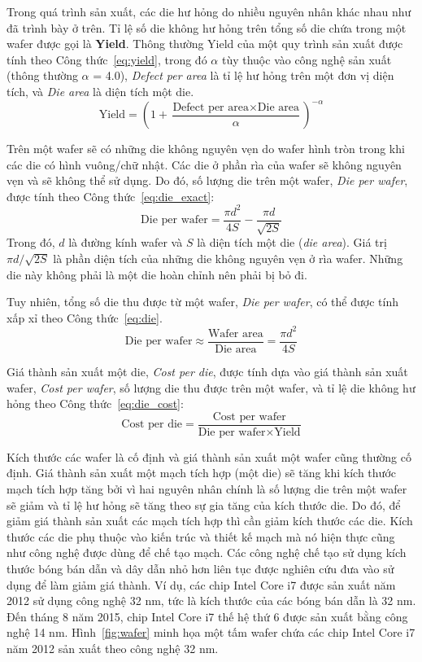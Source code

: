 Trong quá trình sản xuất, các die hư hỏng do nhiều nguyên nhân khác nhau như đã trình bày ở trên. Tỉ lệ số die không hư hỏng trên tổng số die chứa trong một wafer được gọi là \textbf{Yield}. Thông thường Yield của một quy trình sản xuất được tính theo Công thức~\ref{eq:yield}, trong đó $\alpha$ tùy thuộc vào công nghệ sản xuất (thông thường $\alpha$ = 4.0), \emph{Defect per area} là tỉ lệ hư hỏng trên một đơn vị diện tích, và \emph{Die area} là diện tích một die.
\begin{equation}
\label{eq:yield}
\text{Yield} = (1 + \frac{\text{Defect per area} \times \text{Die area}}{\alpha})^{-\alpha}
\end{equation}

Trên một wafer sẽ có những die không nguyên vẹn do wafer hình tròn trong khi các die có hình vuông/chữ nhật. Các die ở phần rìa của wafer sẽ không nguyên vẹn và sẽ không thể sử dụng. Do đó, số lượng die trên một wafer, \emph{Die per wafer}, được tính theo Công thức~\ref{eq:die_exact}:
\begin{equation}
\label{eq:die_exact}
	\text{Die per wafer} = \frac{\pi d^2}{4S} - \frac{\pi d}{\sqrt{2S}}
\end{equation}
Trong đó, $d$ là đường kính wafer và $S$ là diện tích một die (\emph{die area}). Giá trị $\pi d/\sqrt{2S}$ là phần diện tích của những die không nguyên vẹn ở rìa wafer. Những die này không phải là một die hoàn chỉnh nên phải bị bỏ đi.

Tuy nhiên, tổng số die thu được từ một wafer, \emph{Die per wafer}, có thể được tính xấp xỉ theo Công thức~\ref{eq:die}.
\begin{equation}
\label{eq:die}
\text{Die per wafer} \approx \frac{\text{Wafer area}}{\text{Die area}} = \frac{\pi d^2}{4S}
\end{equation}

Giá thành sản xuất một die, \emph{Cost per die}, được tính dựa vào giá thành sản xuất wafer, \emph{Cost per wafer}, số lượng die thu được trên một wafer, và tỉ lệ die không hư hỏng theo Công thức~\ref{eq:die_cost}:
\begin{equation}
\label{eq:die_cost}
\text{Cost per die} = \frac{\text{Cost per wafer}}{\text{Die per wafer} \times \text{Yield}}
\end{equation}

Kích thước các wafer là cố định và giá thành sản xuất một wafer cũng thường cố định. Giá thành sản xuất một mạch tích hợp (một die) sẽ tăng khi kích thước mạch tích hợp tăng bởi vì hai nguyên nhân chính là số lượng die trên một wafer sẽ giảm và tỉ lệ hư hỏng sẽ tăng theo sự gia tăng của kích thước die. Do đó, để giảm giá thành sản xuất các mạch tích hợp thì cần giảm kích thước các die. Kích thước các die phụ thuộc vào kiến trúc và thiết kế mạch mà nó hiện thực cũng như công nghệ được dùng để chế tạo mạch. Các công nghệ chế tạo sử dụng kích thước bóng bán dẫn và dây dẫn nhỏ hơn liên tục được nghiên cứu đưa vào sử dụng để làm giảm giá thành. Ví dụ, các chip Intel Core i7 được sản xuất năm 2012 sử dụng công nghệ 32 nm, tức là kích thước của các bóng bán dẫn là 32 nm. Đến tháng 8 năm 2015, chip Intel Core i7 thế hệ thứ 6 được sản xuất bằng công nghệ 14 nm. Hình~\ref{fig:wafer} minh họa một tấm wafer chứa các chip Intel Core i7 năm 2012 sản xuất theo công nghệ 32 nm.

